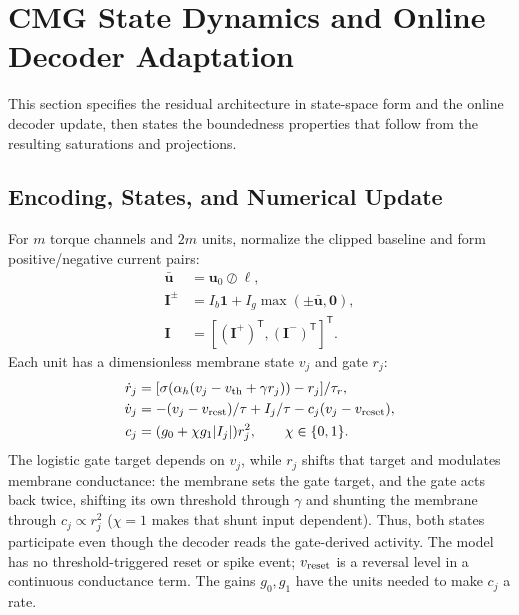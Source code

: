 \documentclass[letterpaper, 10 pt, conference]{ieeeconf}
\newcommand{\T}{^{\mathsf T}}
\begin{document}
\section{CMG State Dynamics and Online Decoder Adaptation}
\label{sec:architecture}
\label{sec:analysis}
This section specifies the residual architecture in state-space form and the online decoder update, then states the boundedness properties that follow from the resulting saturations and projections.
\subsection{Encoding, States, and Numerical Update}

For $m$ torque channels and $2m$ units, normalize the clipped baseline and
form positive/negative current pairs:
\begin{equation}
 \begin{aligned}
 \bar{\bm u}&=\bm u_0\oslash\bm\ell,\\
 \bm I^{\pm}&=I_b\bm1+I_g\max(\pm\bar{\bm u},\bm0),\\
 \bm I&=[(\bm I^+)\T,(\bm I^-)\T]\T.
 \end{aligned}
 \label{eq:encoding}
\end{equation}
Each unit has a dimensionless membrane state $v_j$ and gate $r_j$:
\begin{align}
 \dot r_j&=[\sigma(\alpha_h(v_j-v_{\rm th}+\gamma r_j))-r_j]/\tau_r,\\
 \dot v_j&=-(v_j-v_{\rm rest})/\tau+I_j/\tau-c_j(v_j-v_{\rm reset}),\\
 c_j&=(g_0+\chi g_1|I_j|)r_j^2,\qquad \chi\in\{0,1\}.
 \label{eq:cmg}
\end{align}
The logistic gate target depends on $v_j$, while $r_j$ shifts that target
and modulates membrane conductance: the membrane sets the gate target, and
the gate acts back twice, shifting its own threshold through $\gamma$ and
shunting the membrane through $c_j\propto r_j^2$ ($\chi=1$ makes that shunt
input dependent). Thus, both states participate even
though the decoder reads the gate-derived activity. The model has no
threshold-triggered reset or spike event; $v_{\rm reset}$ is a reversal
level in a continuous conductance term. The gains $g_0,g_1$ have the units
needed to make $c_j$ a rate.
\end{document}
